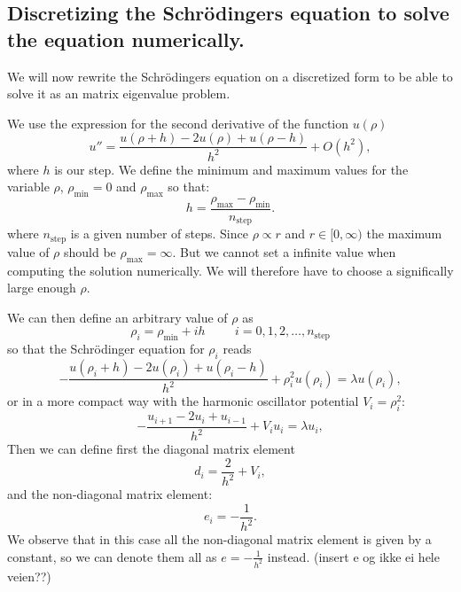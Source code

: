 \documentclass[11pt,a4wide]{article}
\begin{document}
\subsection{Discretizing the Schr\"odingers equation to solve the equation numerically.} \label{sec: descrete}
We will now rewrite the Schr\"odingers equation on a discretized form to be able to solve it as an matrix eigenvalue problem.

We use the expression for the second derivative of the function $u(\rho)$
\begin{equation}
    u''=\frac{u(\rho+h) -2u(\rho) +u(\rho-h)}{h^2} +O(h^2),
    \label{eq:diffoperation}
\end{equation} 
where $h$ is our step. We define the minimum and maximum values for the variable $\rho$,
$\rho_{\mathrm{min}}=0$  and $\rho_{\mathrm{max}}$ so that:
\[
  h=\frac{\rho_{\mathrm{max}}-\rho_{\mathrm{min}} }{n_{\mathrm{step}}}.
\]
where $n_{\mathrm{step}}$ is a given number of steps. Since $\rho \propto r$ and $r\in [0,\infty)$ the maximum value of $\rho$ should be $\rho_{\mathrm{max}}=\infty$. But we cannot set a infinite value when computing the solution numerically. We will therefore have to choose a significally large enough $\rho$.

We can then define an arbitrary value of $\rho$ as 
\[
    \rho_i= \rho_{\mathrm{min}} + ih \hspace{1cm} i=0,1,2,\dots , n_{\mathrm{step}}
\]
so that the Schr\"odinger equation for $\rho_i$ reads
\[
-\frac{u(\rho_i+h) -2u(\rho_i) +u(\rho_i-h)}{h^2}+\rho_i^2u(\rho_i)  = \lambda u(\rho_i),
\]
or in a more compact way with the harmonic oscillator potential $V_i=\rho_i^2$:
\begin{equation}
-\frac{u_{i+1} -2u_i +u_{i-1} }{h^2}+V_iu_i  = \lambda u_i,
\label{eq: sch_discrete_first}
\end{equation}
Then we can define first the diagonal matrix element
\[
   d_i=\frac{2}{h^2}+V_i,
\]
and the non-diagonal matrix element:
\[
   e_i=-\frac{1}{h^2}.
\]
We observe that in this case all the non-diagonal matrix element is given by a constant, so we can denote them all as $e=-\frac{1}{h^2}$ instead. (insert e og ikke ei hele veien??)
 
\end{document}
